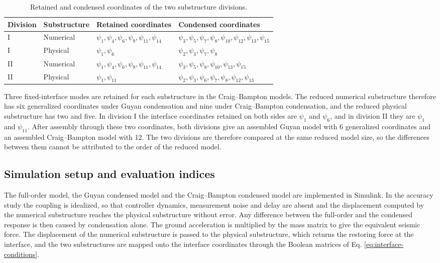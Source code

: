 \documentclass[11pt,a4paper]{article}
\numberwithin{equation}{section}
\begin{document}
\begin{table}[htbp]
	\centering
	\caption{Retained and condensed coordinates of the two substructure divisions.}
	\label{tab:dof-sets}
	\begin{tabular}{llll}
		\toprule
		Division & Substructure & Retained coordinates & Condensed coordinates\\
		\midrule
		I  & Numerical & \(\psi_{1},\psi_{4},\psi_{6},\psi_{9},\psi_{11},\psi_{14}\)
		& \(\psi_{3},\psi_{5},\psi_{7},\psi_{8},\psi_{10},\psi_{12},\psi_{13},\psi_{15}\)\\
		I  & Physical  & \(\psi_{1},\psi_{6}\)
		& \(\psi_{2},\psi_{3},\psi_{7},\psi_{8}\)\\
		\midrule
		II & Numerical & \(\psi_{1},\psi_{4},\psi_{6},\psi_{9},\psi_{11},\psi_{14}\)
		& \(\psi_{3},\psi_{5},\psi_{8},\psi_{10},\psi_{13},\psi_{15}\)\\
		II & Physical  & \(\psi_{1},\psi_{11}\)
		& \(\psi_{2},\psi_{3},\psi_{6},\psi_{7},\psi_{8},\psi_{12},\psi_{13}\)\\
		\bottomrule
	\end{tabular}
\end{table}

Three fixed-interface modes are retained for each substructure in the Craig--Bampton models. The reduced numerical substructure therefore has six generalized coordinates under Guyan condensation and nine under Craig--Bampton condensation, and the reduced physical substructure has two and five. In division I the interface coordinates retained on both sides are \(\psi_{1}\) and \(\psi_{6}\), and in division II they are \(\psi_{1}\) and \(\psi_{11}\). After assembly through these two coordinates, both divisions give an assembled Guyan model with 6 generalized coordinates and an assembled Craig--Bampton model with 12. The two divisions are therefore compared at the same reduced model size, so the differences between them cannot be attributed to the order of the reduced model.

\subsection{Simulation setup and evaluation indices}
\label{sec:setup}

The full-order model, the Guyan condensed model and the Craig--Bampton condensed model are implemented in Simulink. In the accuracy study the coupling is idealized, so that controller dynamics, measurement noise and delay are absent and the displacement computed by the numerical substructure reaches the physical substructure without error. Any difference between the full-order and the condensed response is then caused by condensation alone. The ground acceleration is multiplied by the mass matrix to give the equivalent seismic force. The displacement of the numerical substructure is passed to the physical substructure, which returns the restoring force at the interface, and the two substructures are mapped onto the interface coordinates through the Boolean matrices of Eq. \eqref{eq:interface-conditions}.
\end{document}
